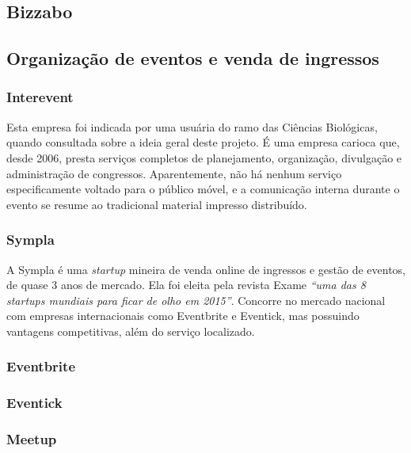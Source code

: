 \documentclass[12pt,a4paper,twoside,hyphens,english,brazil]{abntex2}
\begin{document}
\subsection{Bizzabo} \label{sec:concorrencia:bizzabo}

\subsection{Organização de eventos e venda de ingressos} \label{sec:concorrencia:organizacao_venda}

\subsubsection*{Interevent}
Esta empresa foi indicada por uma usuária do ramo das Ciências Biológicas, quando consultada sobre a ideia geral deste projeto. É uma empresa carioca que, desde 2006, presta serviços completos de planejamento, organização, divulgação e administração de congressos. Aparentemente, não há nenhum serviço especificamente voltado para o público móvel, e a comunicação interna durante o evento se resume ao tradicional material impresso distribuído.

\subsubsection*{Sympla}
A Sympla é uma \emph{startup} mineira de venda online de ingressos e gestão de eventos, de quase 3 anos de mercado. Ela foi eleita pela revista Exame \emph{``uma das 8 startups mundiais para ficar de olho em 2015''}\cite{exame-8-startups}. Concorre no mercado nacional com empresas internacionais como Eventbrite e Eventick, mas possuindo vantagens competitivas, além do serviço localizado.

\subsubsection*{Eventbrite}

\subsubsection*{Eventick}

\subsubsection*{Meetup}
\end{document}
